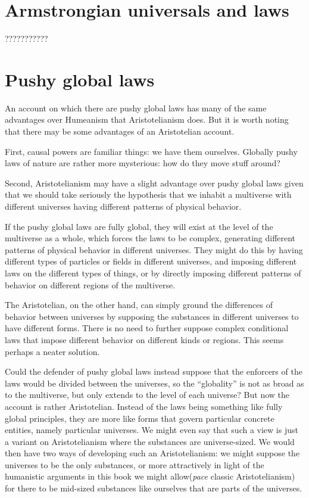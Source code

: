 \section{Armstrongian universals and laws}
???????????

\section{Pushy global laws}
An account on which there are pushy global laws has many of the same advantages over Humeanism that Aristotelianism
does. But it is worth noting that there may be some advantages of an Aristotelian account.

First, causal powers are familiar things: we have them ourselves. Globally pushy laws of nature are rather more mysterious:
how do they move stuff around?

Second, Aristotelianism may have a slight advantage over pushy global laws given that we should take seriously
the hypothesis that we inhabit a multiverse with different universes having different patterns of physical behavior. 

If the pushy global laws are fully global, they will exist at the level of the multiverse as a whole, which forces the
laws to be complex, generating different patterns of physical behavior in different universes. They might do this
by having different types of particles or fields in different universes, and imposing different laws on the 
different types of things, or by directly imposing different patterns of behavior on different regions of the multiverse.

The Aristotelian, on the other hand, can simply ground the differences of behavior between universes by supposing 
the substances in different universes to have different forms. There is no need to further suppose complex conditional 
laws that impose different behavior on different kinds or regions. This seems perhaps a neater solution.

Could the defender of pushy global laws instead suppose that the enforcers of the laws would be divided between the 
universes, so the ``globality'' is not as broad as to the multiverse, but only extends to the level of each universe?
But now the account is rather Aristotelian. Instead of the laws being something like fully global principles, they are 
more like forms that govern particular concrete entities, namely particular universes. We might even say that such a 
view is just a variant on Aristotelianism where the substances are universe-sized. We would then have two ways of 
developing such an Aristotelianism: we might suppose the universes to be the only substances, or more attractively 
in light of the humanistic arguments in this book we might allow(\textit{pace} classic Aristotelianism) for there to 
be mid-sized substances like ourselves that are parts of the universes. 


\chaptertail
